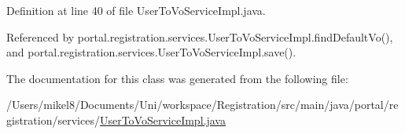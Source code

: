Definition at line 40 of file UserToVoServiceImpl.java.



Referenced by portal.registration.services.UserToVoServiceImpl.findDefaultVo(), and portal.registration.services.UserToVoServiceImpl.save().



The documentation for this class was generated from the following file:\begin{DoxyCompactItemize}
\item 
/Users/mikel8/Documents/Uni/workspace/Registration/src/main/java/portal/registration/services/\hyperlink{UserToVoServiceImpl_8java}{UserToVoServiceImpl.java}\end{DoxyCompactItemize}
